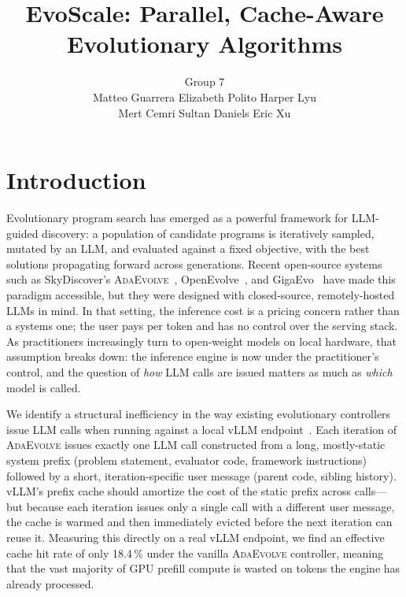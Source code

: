 \documentclass{article}
\author{}
\date{}
\title{EvoScale: Parallel, Cache-Aware Evolutionary Algorithms}
\author{
Group 7 \\ Matteo Guarrera \quad Elizabeth Polito \quad Harper Lyu \\ Mert Cemri \quad Sultan Daniels \quad Eric Xu
}
\newcommand{\adaev}{\textsc{AdaEvolve}}
\begin{document}
\maketitle
\author{}
% 
\vspace{-0.5cm}

\vspace{-0.3cm}






\section{Introduction}

Evolutionary program search has emerged as a powerful framework for
LLM-guided discovery: a population of candidate programs is iteratively
sampled, mutated by an LLM, and evaluated against a fixed objective,
with the best solutions propagating forward across generations. Recent
open-source systems such as SkyDiscover's \adaev{}~\cite{cemri2026skydiscover},
OpenEvolve~\cite{rudes2025openevolve}, and GigaEvo~\cite{khrulkov2025gigaevo}
have made this paradigm accessible, but they were designed with
closed-source, remotely-hosted LLMs in mind. In that setting, the
inference cost is a pricing concern rather than a systems one; the user
pays per token and has no control over the serving stack. As
practitioners increasingly turn to open-weight models on local hardware,
that assumption breaks down: the inference engine is now under the
practitioner's control, and the question of \emph{how} LLM calls are
issued matters as much as \emph{which} model is called.

We identify a structural inefficiency in the way existing evolutionary
controllers issue LLM calls when running against a local vLLM
endpoint~\cite{kwon2023pagedattention}. Each iteration of \adaev{}
issues exactly one LLM call constructed from a long, mostly-static
system prefix (problem statement, evaluator code, framework instructions)
followed by a short, iteration-specific user message (parent code,
sibling history). vLLM's prefix cache should amortize the cost of the
static prefix across calls---but because each iteration issues only a
single call with a different user message, the cache is warmed and then
immediately evicted before the next iteration can reuse it. Measuring
this directly on a real vLLM endpoint, we find an effective cache hit
rate of only 18.4\,\% under the vanilla \adaev{} controller, meaning
that the vast majority of GPU prefill compute is wasted on tokens the
engine has already processed.
\end{document}

